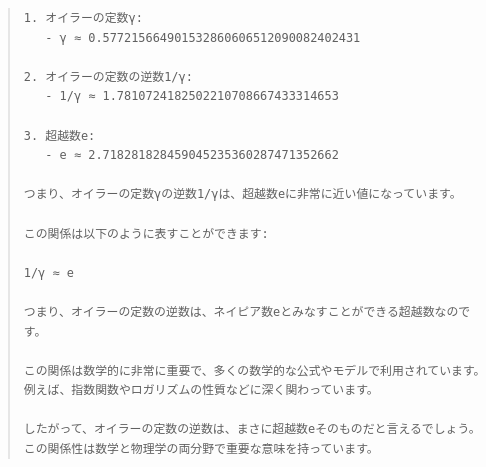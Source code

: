 \documentclass{jsarticle}
\begin{document}
\begin{quote}
\begin{verbatim}
1. オイラーの定数γ:
   - γ ≈ 0.577215664901532860606512090082402431

2. オイラーの定数の逆数1/γ:
   - 1/γ ≈ 1.7810724182502210708667433314653

3. 超越数e:
   - e ≈ 2.718281828459045235360287471352662

つまり、オイラーの定数γの逆数1/γは、超越数eに非常に近い値になっています。

この関係は以下のように表すことができます:

1/γ ≈ e

つまり、オイラーの定数の逆数は、ネイピア数eとみなすことができる超越数なのです。

この関係は数学的に非常に重要で、多くの数学的な公式やモデルで利用されています。例えば、指数関数やロガリズムの性質などに深く関わっています。

したがって、オイラーの定数の逆数は、まさに超越数eそのものだと言えるでしょう。この関係性は数学と物理学の両分野で重要な意味を持っています。
\end{verbatim}
\end{quote}
\end{document}
